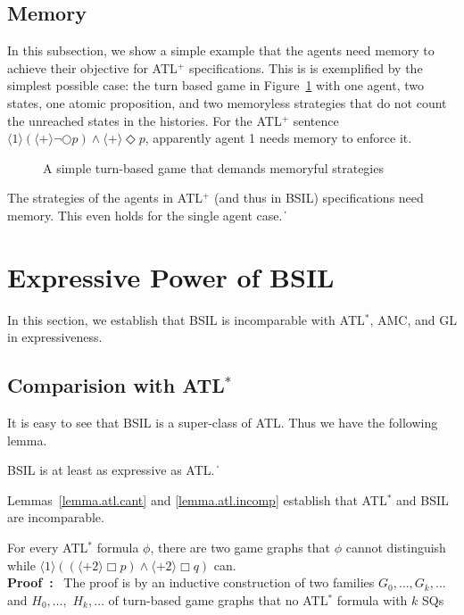 \documentclass[11pt]{article}
\newcommand{\pf}{\noindent\mbox{\bf Proof : }}
\newcommand{\pfrr}{\Box}
\newcommand{\pevt}{\Diamond}
\newcommand{\nxt}{\bigcirc}
\def\qed{\ifmmode\|\else{\unskip\nobreak\hfil
\penalty50\hskip1em\null\nobreak\hfil$\blacksquare$
\parfillskip=0pt\finalhyphendemerits=0\endgraf}\fi}
\begin{document}
\subsection{Memory}

In this subsection, we show a simple example that 
the agents need memory to achieve their objective for ATL$^+$ 
specifications.
This is is exemplified by the simplest possible case: 
the turn based game in Figure~\ref{fig.gg.fin} 
with one agent, two states, one atomic proposition, 
and two memoryless strategies 
that do not count the unreached states in the histories.
For the ATL$^+$ sentence 
$\langle 1 \rangle (\langle + \rangle \neg \nxt p) 
\wedge \langle + \rangle \pevt p$, 
apparently agent 1 needs memory to enforce it.  
\begin{figure}[t]
\begin{center} 

\end{center}
\caption{A simple turn-based game that demands memoryful strategies}
\label{fig.gg.fin}
\end{figure}

{\lemma \label{lemma.mem.fin}
The strategies of the agents in ATL$^+$ 
(and thus in BSIL) specifications need memory.
This even holds for the single agent case.
\qed 
}


\section{Expressive Power of BSIL \label{sec.exp}}

In this section, we establish that BSIL is incomparable with ATL$^*$, 
AMC, and GL \cite{AHK02} in expressiveness.



\subsection{Comparision with ATL$^*$ \label{subsec.exp.atl} }

It is easy to see that BSIL is a super-class of ATL.
Thus we have the following lemma.

{\lemma \label{lemma.atl.less}
BSIL is at least as expressive as ATL.  
}
\qed

Lemmas~\ref{lemma.atl.cant} and \ref{lemma.atl.incomp} establish  
that ATL$^*$ and BSIL are incomparable. 


{\lemma \label{lemma.atl.cant} 
For every ATL$^*$ formula $\phi$,
there are two game graphs that
$\phi$ cannot distinguish while
$\langle 1\rangle ((\langle+ 2\rangle\pfrr p)
    \wedge \langle+ 2\rangle\pfrr q)$ can.
}\\\pf 
The proof is by an inductive construction of 
two families $G_0,\ldots,G_k,\ldots$ 
and $H_0,\ldots,$ $H_k,\ldots$ of turn-based game graphs that 
no ATL$^*$ formula with $k$ SQs can distinguish $G_k$ and $H_k$.  
We prove the lemma by induction on $k$.  
\end{document}

